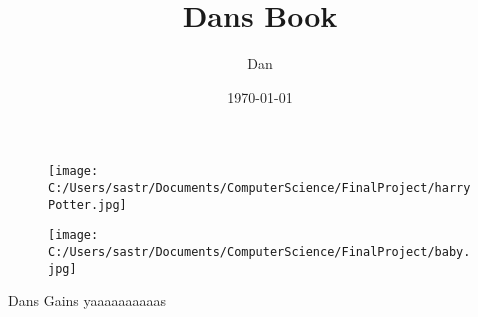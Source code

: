 \documentclass{article}%
\title{Dans Book}%
\author{Dan}%
\date{\today}%
\begin{document}
%
\normalsize%


\begin{figure}[h!]%
\centering%
\texttt{[image: C:/Users/sastr/Documents/ComputerScience/FinalProject/harryPotter.jpg]}%
\end{figure}

%
\maketitle%


\begin{figure}[h!]%
\centering%
\texttt{[image: C:/Users/sastr/Documents/ComputerScience/FinalProject/baby.jpg]}%
\end{figure}

%
Dans Gains yaaaaaaaaaas%
\end{document}
